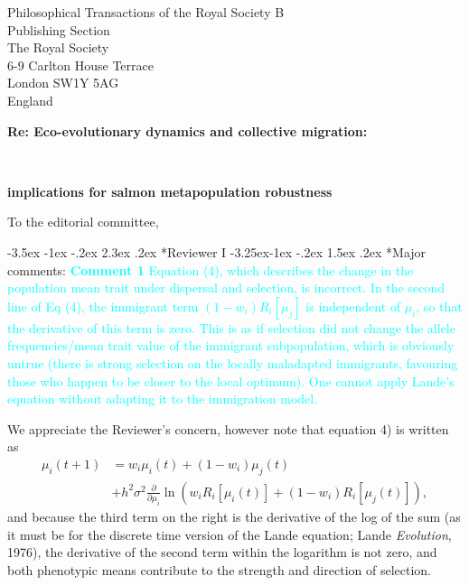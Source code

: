 \documentclass[ucm,12pt]{ucletter}
\makeatletter
\newcounter{section}
\newcounter{subsection}[section]
\renewcommand\section{\@startsection {section}{1}{\z@}%
                                   {-3.5ex \@plus -1ex \@minus -.2ex}%
                                   {2.3ex \@plus.2ex}%
                                   {\normalfont\Large\bfseries}}
\newcommand\subsection{\@startsection{subsection}{2}{\z@}%
                                     {-3.25ex\@plus -1ex \@minus -.2ex}%
                                     {1.5ex \@plus .2ex}%
                                     {\normalfont\large\bfseries}}
\makeatother
\begin{document}
\begin{letter}{
    Philosophical Transactions of the Royal Society B\\
    Publishing Section\\
    The Royal Society\\
    6-9 Carlton House Terrace\\
    London SW1Y 5AG\\
    England\\
    \centerline{\bf{Re: Eco-evolutionary dynamics and collective migration:}}\\
     \centerline{\bf{implications for salmon metapopulation robustness}}
}


\opening{To the editorial committee,}


\section*{Reviewer I}
\subsection*{Major comments:}
\noindent \textcolor{cyan}{
{\bf Comment 1} Equation (4), which describes the change in the population mean trait under dispersal and selection, is incorrect. In the second line of Eq (4), the immigrant term $(1-w_i) R_i [\mu_j]$ is independent of $\mu_i$, so that the derivative of this term is zero. This is as if selection did not change the allele frequencies/mean trait value of the immigrant subpopulation, which is obviously untrue (there is strong selection on the locally maladapted immigrants, favouring those who happen to be closer to the local optimum). One cannot apply Lande's equation without adapting it to the immigration model.
}

 We appreciate the Reviewer's concern, however note that equation 4) is written as
\begin{align}
  \label{eq:mu}
  \mu_i(t+1) &= w_i\mu_i(t) + (1-w_i)\mu_j(t) \\ \nonumber
  &+ h^2\sigma^2\frac{\partial}{\partial \mu_i}\ln\left(w_i R_i[\mu_i(t)] + (1-w_i)R_i[\mu_j(t)]  \right),
\end{align}
and because the third term on the right is the derivative of the log of the sum (as it must be for the discrete time version of the Lande equation; Lande \emph{Evolution}, 1976), the derivative of the second term within the logarithm is not zero, and both phenotypic means contribute to the strength and direction of selection.



\end{letter}
\end{document}
